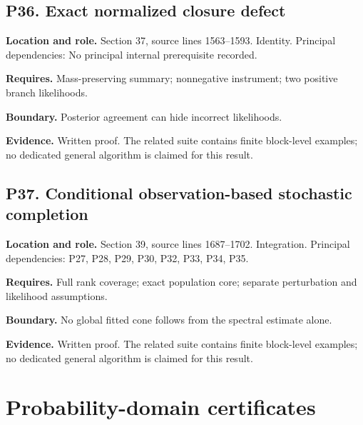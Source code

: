 \documentclass[11pt,oneside,openany]{book}
\numberwithin{equation}{section}
\begin{document}
\par\noindent\begin{minipage}{\textwidth}
\subsection{P36. Exact normalized closure
defect}\label{LSMRegister:p36.-exact-normalized-closure-defect}

\textbf{Location and role.} Section 37, source lines 1563--1593.
Identity. Principal dependencies: No principal internal prerequisite
recorded.

\textbf{Requires.} Mass-preserving summary; nonnegative instrument; two
positive branch likelihoods.

\textbf{Boundary.} Posterior agreement can hide incorrect likelihoods.

\textbf{Evidence.} Written proof. The related suite contains finite
block-level examples; no dedicated general algorithm is claimed for this
result.
\end{minipage}\par\medskip

\par\noindent\begin{minipage}{\textwidth}
\subsection{P37. Conditional observation-based stochastic
completion}\label{LSMRegister:p37.-conditional-observation-based-stochastic-completion}

\textbf{Location and role.} Section 39, source lines 1687--1702.
Integration. Principal dependencies: P27, P28, P29, P30, P32, P33, P34,
P35.

\textbf{Requires.} Full rank coverage; exact population core; separate
perturbation and likelihood assumptions.

\textbf{Boundary.} No global fitted cone follows from the spectral
estimate alone.

\textbf{Evidence.} Written proof. The related suite contains finite
block-level examples; no dedicated general algorithm is claimed for this
result.
\end{minipage}\par\medskip


\section{Probability-domain
certificates}\label{LSMRegister:probability-domain-certificates}
\end{document}
